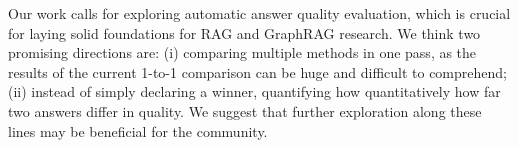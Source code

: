Our work calls for exploring automatic answer quality evaluation, which is crucial for laying solid foundations for RAG and GraphRAG research. We think two promising directions are: (i) comparing multiple methods in one pass, as the results of the current 1-to-1 comparison can be huge and difficult to comprehend; (ii) instead of simply declaring a winner, quantifying how quantitatively how far two answers differ in quality. 
We suggest that further exploration along these lines may be beneficial for the community.    


